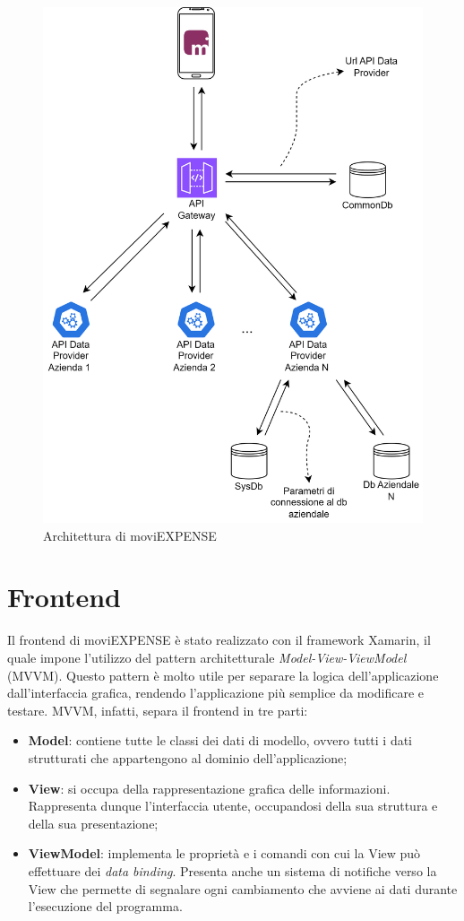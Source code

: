 \begin{figure}[H]
    \centering 
    \includegraphics[width=.8\columnwidth]{images/architettura moviEXPENSE.png} 
    \caption{Architettura di moviEXPENSE}
    \label{fig:microservizi}
\end{figure}

\section{Frontend}

Il frontend di moviEXPENSE è stato realizzato con il framework Xamarin, il quale impone l'utilizzo del pattern architetturale \emph{Model-View-ViewModel} (MVVM). Questo pattern è molto utile per separare la logica dell'applicazione dall'interfaccia grafica, rendendo l'applicazione più semplice da modificare e testare. MVVM, infatti, separa il frontend in tre parti:
\begin{itemize}
    \item \textbf{Model}: contiene tutte le classi dei dati di modello, ovvero tutti i dati strutturati che appartengono al dominio dell'applicazione;
    \item \textbf{View}: si occupa della rappresentazione grafica delle informazioni. Rappresenta dunque l'interfaccia utente, occupandosi della sua struttura e della sua presentazione;
    \item \textbf{ViewModel}: implementa le proprietà e i comandi con cui la View può effettuare dei \emph{data binding}. Presenta anche un sistema di notifiche verso la View che permette di segnalare ogni cambiamento che avviene ai dati durante l'esecuzione del programma.
\end{itemize}

